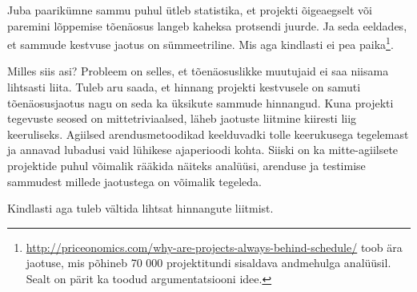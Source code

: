 \documentclass{article}
\begin{document}
Juba paarikümne sammu puhul ütleb statistika, et projekti õigeaegselt või paremini lõppemise tõenäosus langeb kaheksa protsendi juurde. Ja seda eeldades, et sammude kestvuse jaotus on sümmeetriline. Mis aga kindlasti ei pea paika\footnote{\url{http://priceonomics.com/why-are-projects-always-behind-schedule/} toob ära jaotuse, mis põhineb 70 000 projektitundi sisaldava andmehulga analüüsil. Sealt on pärit ka toodud argumentatsiooni idee.}. 

Milles siis asi? Probleem on selles, et tõenäosuslikke muutujaid ei saa niisama lihtsasti liita. Tuleb aru saada, et hinnang projekti kestvusele on samuti tõenäosusjaotus nagu on seda ka üksikute sammude hinnangud. Kuna projekti tegevuste seosed on mittetriviaalsed, läheb jaotuste liitmine kiiresti liig keeruliseks. Agiilsed arendusmetoodikad keelduvadki tolle keerukusega tegelemast ja annavad lubadusi vaid lühikese ajaperioodi kohta. Siiski on ka mitte-agiilsete projektide puhul võimalik rääkida näiteks analüüsi, arenduse ja testimise sammudest millede jaotustega on võimalik tegeleda.  

Kindlasti aga tuleb vältida lihtsat hinnangute liitmist.
\end{document}
